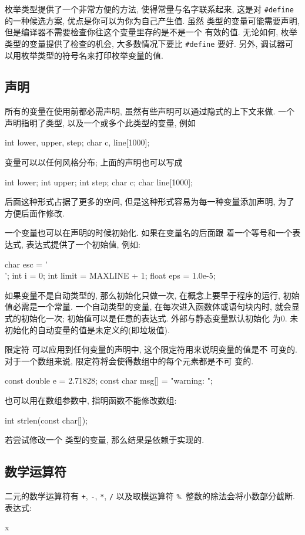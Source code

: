 枚举类型提供了一个非常方便的方法, 使得常量与名字联系起来, 这是对 
\verb"#define" 的一种候选方案, 优点是你可以为你为自己产生值. 虽然 \cenum 
类型的变量可能需要声明, 但是编译器不需要检查你往这个变量里存的是不是一个
有效的值. 无论如何, 枚举类型的变量提供了检查的机会, 大多数情况下要比
\verb"#define" 要好. 另外, 调试器可以用枚举类型的符号名来打印枚举变量的值.

\subsection{声明}
所有的变量在使用前都必需声明, 虽然有些声明可以通过隐式的上下文来做. 一个 
声明指明了类型, 以及一个或多个此类型的变量, 例如 
\begin{myverbatim}
    int lower, upper, step;
    char c, line[1000];
\end{myverbatim}
变量可以以任何风格分布; 上面的声明也可以写成
\begin{myverbatim}
    int lower;
    int upper;
    int step;
    char c;
    char line[1000];
\end{myverbatim}
后面这种形式占据了更多的空间, 但是这种形式容易为每一种变量添加声明, 为了 
方便后面作修改.

一个变量也可以在声明的时候初始化. 如果在变量名的后面跟 着一个等号和一个表
达式, 表达式提供了一个初始值, 例如:
\begin{myverbatim}
    char esc = '\\';
    int  i = 0;
    int  limit = MAXLINE + 1;
    float eps = 1.0e-5;
\end{myverbatim}
如果变量不是自动类型的, 那么初始化只做一次, 在概念上要早于程序的运行,
初始值必需是一个常量. 一个自动类型的变量, 在每次进入函数体或语句块内时, 
就会显式的初始化一次; 初始值可以是任意的表达式. 外部与静态变量默认初始化
为0. 未初始化的自动变量的值是未定义的(即垃圾值).

限定符 \cconst 可以应用到任何变量的声明中, 这个限定符用来说明变量的值是不
可变的. 对于一个数组来说, \cconst 限定符将会使得数组中的每个元素都是不可
变的.
\begin{myverbatim}
    const double e = 2.71828;
    const char msg[] = "warning: ";
\end{myverbatim}
\cconst 也可以用在数组参数中, 指明函数不能修改数组:
\begin{myverbatim}
    int strlen(const char[]);
\end{myverbatim}
若尝试修改一个 \cconst 类型的变量, 那么结果是依赖于实现的.

\subsection{数学运算符}
二元的数学运算符有 \verb"+", \verb"-", \verb"*", \verb"/" 以及取模运算符
\verb"%". 整数的除法会将小数部分截断. 表达式:
\begin{myverbatim}
    x %
\end{myverbatim}

